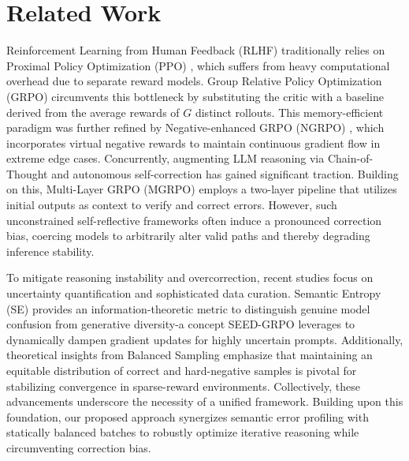 \section{Related Work}

Reinforcement Learning from Human Feedback (RLHF) \cite{10.5555/3294996.3295184}\cite{Ji2024ReinforcementLF} traditionally relies on Proximal Policy Optimization (PPO) \cite{schulman2017proximalpolicyoptimizationalgorithms}, which suffers from heavy computational overhead due to separate reward models. Group Relative Policy Optimization (GRPO) \cite{shao2024deepseekmathpushinglimitsmathematical} circumvents this bottleneck by substituting the critic with a baseline derived from the average rewards of $G$ distinct rollouts. This memory-efficient paradigm was further refined by Negative-enhanced GRPO (NGRPO) \cite{nan2025ngrponegativeenhancedgrouprelative}, which incorporates virtual negative rewards to maintain continuous gradient flow in extreme edge cases. Concurrently, augmenting LLM reasoning via Chain-of-Thought \cite{10.5555/3600270.3602070} and autonomous self-correction \cite{madaan2023selfrefineiterativerefinementselffeedback} has gained significant traction. Building on this, Multi-Layer GRPO (MGRPO) \cite{ding2025multilayergrpoenhancingreasoning} employs a two-layer pipeline that utilizes initial outputs as context to verify and correct errors. However, such unconstrained self-reflective frameworks often induce a pronounced correction bias, coercing models to arbitrarily alter valid paths and thereby degrading inference stability.

To mitigate reasoning instability and overcorrection, recent studies focus on uncertainty quantification and sophisticated data curation. Semantic Entropy (SE) \cite{kuhn2023semanticuncertaintylinguisticinvariances} provides an information-theoretic metric to distinguish genuine model confusion from generative diversity-a concept SEED-GRPO \cite{chen2025seedgrposemanticentropyenhanced} leverages to dynamically dampen gradient updates for highly uncertain prompts. Additionally, theoretical insights from Balanced Sampling \cite{gao2026divagrpoenhancingmultimodalreasoning} emphasize that maintaining an equitable distribution of correct and hard-negative samples is pivotal for stabilizing convergence in sparse-reward environments. Collectively, these advancements underscore the necessity of a unified framework. Building upon this foundation, our proposed approach synergizes semantic error profiling with statically balanced batches to robustly optimize iterative reasoning while circumventing correction bias.
